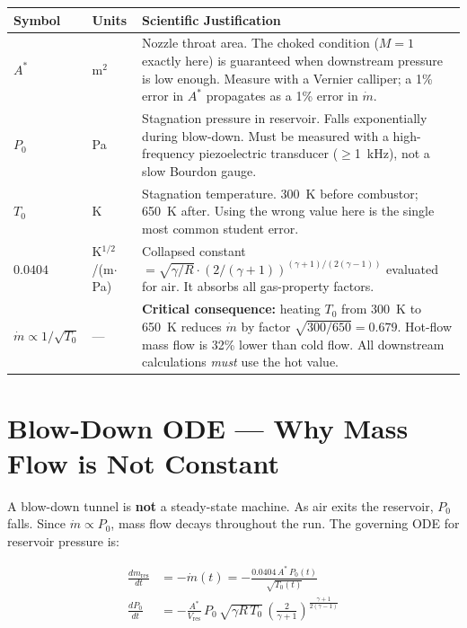 \documentclass[12pt,a4paper]{report}
\begin{document}
\begin{center}
\renewcommand{\arraystretch}{1.5}
\begin{tabularx}{\linewidth}{@{}llX@{}}
  \toprule
  \textbf{Symbol} & \textbf{Units} & \textbf{Scientific Justification}\\
  \midrule
  $A^*$ & m$^2$
    & Nozzle throat area. The choked condition ($M=1$ exactly here) is
      guaranteed when downstream pressure is low enough. Measure with
      a Vernier calliper; a 1\% error in $A^*$ propagates as a 1\%
      error in $\dot{m}$.\\
  $P_0$ & Pa
    & Stagnation pressure in reservoir. Falls exponentially during
      blow-down. Must be measured with a high-frequency piezoelectric
      transducer ($\geq$1~kHz), not a slow Bourdon gauge.\\
  $T_0$ & K
    & Stagnation temperature. 300~K before combustor; 650~K after.
      Using the wrong value here is the single most common student
      error.\\
  $0.0404$ & K$^{1/2}$/(m$\cdot$Pa)
    & Collapsed constant $=\sqrt{\gamma/R}\cdot(2/(\gamma+1))^{(\gamma+1)/(2(\gamma-1))}$
      evaluated for air. It absorbs all gas-property factors.\\
  $\dot{m}\propto 1/\sqrt{T_0}$ & —
    & \textbf{Critical consequence:} heating $T_0$ from 300~K to 650~K
      reduces $\dot{m}$ by factor $\sqrt{300/650}=0.679$.
      Hot-flow mass flow is 32\% lower than cold flow.
      All downstream calculations \emph{must} use the hot value.\\
  \bottomrule
\end{tabularx}
\end{center}

\section{Blow-Down ODE — Why Mass Flow is Not Constant}

A blow-down tunnel is \textbf{not} a steady-state machine. As air exits the
reservoir, $P_0$ falls. Since $\dot{m}\propto P_0$, mass flow decays
throughout the run. The governing ODE for reservoir pressure is:

\begin{formulabox}
\begin{align}
  \frac{dm_\text{res}}{dt} &= -\dot{m}(t)
  = -\frac{0.0404\,A^*\,P_0(t)}{\sqrt{T_0(t)}}
  \label{eq:massode}\\[8pt]
  \frac{dP_0}{dt} &= -\frac{A^*}{V_\text{res}}\,P_0\,
  \sqrt{\gamma R\,T_0}\,
  \left(\frac{2}{\gamma+1}\right)^{\!\frac{\gamma+1}{2(\gamma-1)}}
  \label{eq:pressode}
\end{align}
\end{formulabox}
\end{document}
